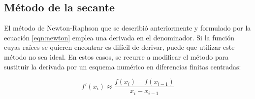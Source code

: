 \subsection{Método de la secante}

El método de Newton-Raphson que se describió anteriormente y formulado por la
ecuación \ref{eqn:newton} emplea una derivada en el denominador. Si la función
cuyas raíces se quieren encontrar es difícil de derivar, puede que utilizar este
método no sea ideal. En estos casos, se recurre a modificar el método para
sustituir la derivada por un esquema numérico en diferencias finitas centradas:

\[
    f'(x_i) \approx \frac{f(x_i) - f(x_{i-1})}{x_i - x_{i-1}}
\]
